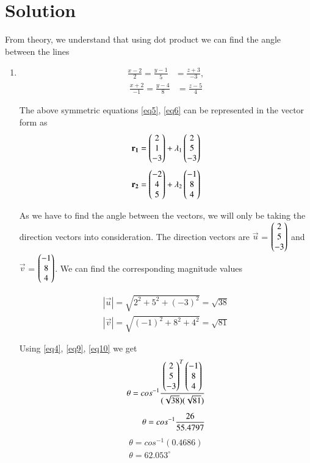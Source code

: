 \documentclass[journal,12pt,twocolumn]{IEEEtran}
\begin{document}
\section{\textbf{Solution}}
From theory, we understand that using dot product we can find the angle between the lines 
\begin{enumerate}
	\item 
	\begin{align}\label{eq5}
		\frac{x-2}{2} = \frac{y-1}{5} &= \frac{z+3}{-3}, 
	\end{align}
	\begin{align}\label{eq6}
		\frac{x+2}{-1} = \frac{y-4}{8} &= \frac{z-5}{4} 
	\end{align}


The above symmetric equations \ref{eq5}, \ref{eq6} can be represented in the vector form as 
\begin{align}\label{eq7}
	\quad \mathbf{r_1} &= \begin{pmatrix}2\\1\\-3\end{pmatrix} + \lambda_1\begin{pmatrix}2\\5\\-3\end{pmatrix}
\end{align}
\begin{align}\label{eq8}
	\quad \mathbf{r_2} &= \begin{pmatrix}-2\\4\\5\end{pmatrix} + \lambda_2\begin{pmatrix}-1\\8\\4\end{pmatrix}
\end{align}

As we have to find the angle between the vectors, we will only be taking the direction vectors into consideration. The direction vectors are $\vec{u}$ = $\begin{pmatrix}2\\5\\-3\end{pmatrix}$ and $\vec{v}$ = $\begin{pmatrix}-1\\8\\4\end{pmatrix}$. We can find the corresponding magnitude values

\begin{align}\label{eq9}
	|\vec{u}| =\sqrt{2^{2}+5^{2}+(-3)^{2}} =\sqrt{38}
\end{align}
\begin{align}\label{eq10}
	|\vec{v}| =\sqrt{(-1)^{2}+8^{2}+4^{2}} =\sqrt{81}
\end{align}

Using \ref{eq4}, \ref{eq9}, \ref{eq10} we get
\begin{align}
	\theta = cos^{-1}\frac{\begin{pmatrix}2\\5\\-3\end{pmatrix}^{T}\begin{pmatrix}-1\\8\\4\end{pmatrix}}{(\sqrt{38})(\sqrt{81})} 
	\\[0.2cm]
	\theta = cos^{-1}\frac{26}{55.4797}
\end{align}
\begin{align}
	\theta = cos^{-1} (0.4686)
	\\[0.2cm]
	\theta = 62.053^\circ
\end{align}


\end{enumerate}
\end{document}
